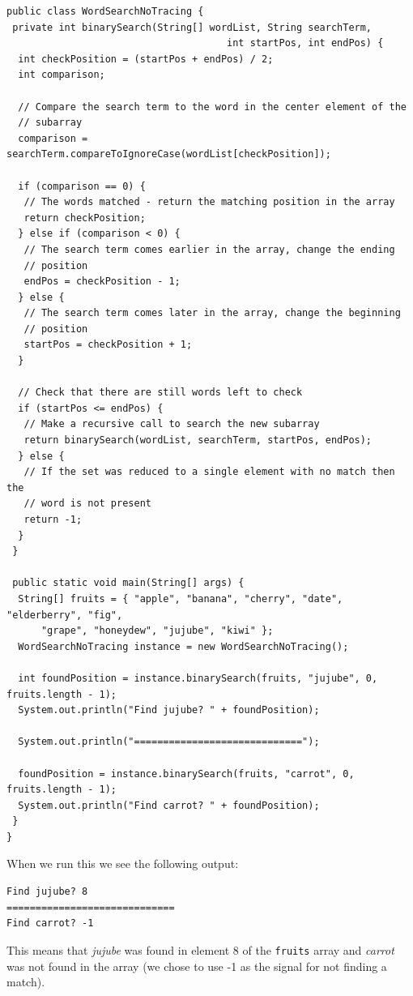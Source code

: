 \beforeverb
\begin{verbatim}
public class WordSearchNoTracing {
 private int binarySearch(String[] wordList, String searchTerm,
                                      int startPos, int endPos) {
  int checkPosition = (startPos + endPos) / 2;
  int comparison;

  // Compare the search term to the word in the center element of the
  // subarray
  comparison = searchTerm.compareToIgnoreCase(wordList[checkPosition]);

  if (comparison == 0) {
   // The words matched - return the matching position in the array
   return checkPosition;
  } else if (comparison < 0) {
   // The search term comes earlier in the array, change the ending
   // position
   endPos = checkPosition - 1;
  } else {
   // The search term comes later in the array, change the beginning
   // position
   startPos = checkPosition + 1;
  }

  // Check that there are still words left to check
  if (startPos <= endPos) {
   // Make a recursive call to search the new subarray
   return binarySearch(wordList, searchTerm, startPos, endPos);
  } else {
   // If the set was reduced to a single element with no match then the
   // word is not present
   return -1;
  }
 }

 public static void main(String[] args) {
  String[] fruits = { "apple", "banana", "cherry", "date", "elderberry", "fig",
      "grape", "honeydew", "jujube", "kiwi" };
  WordSearchNoTracing instance = new WordSearchNoTracing();

  int foundPosition = instance.binarySearch(fruits, "jujube", 0, fruits.length - 1);
  System.out.println("Find jujube? " + foundPosition);

  System.out.println("=============================");
  
  foundPosition = instance.binarySearch(fruits, "carrot", 0, fruits.length - 1);
  System.out.println("Find carrot? " + foundPosition);
 }
}
\end{verbatim}
\afterverb

When we run this we see the following output:

\beforeverb
\begin{verbatim}
Find jujube? 8
=============================
Find carrot? -1
\end{verbatim}
\afterverb

This means that \textit{jujube} was found in element 8 of the \texttt{fruits} array and \textit{carrot} was not found in the array (we chose to use -1 as the signal for not finding a match).

